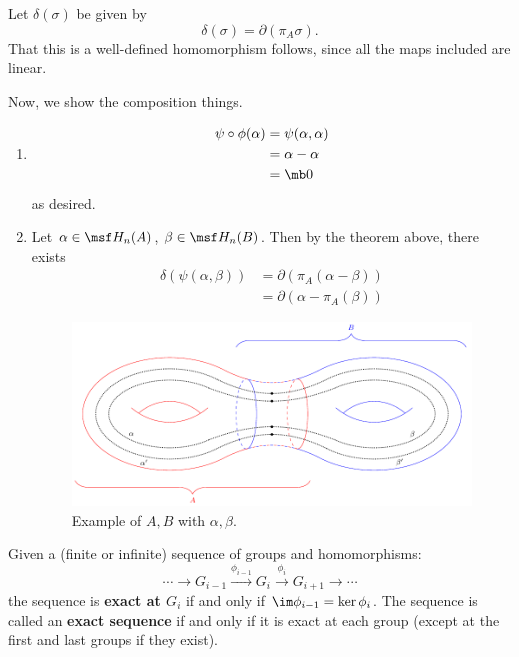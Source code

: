 \begin{solution}
\begin{enumerate}[label=(\arabic*)]
      Let $\delta(\sigma)$ be given by
      \[
        \delta(\sigma) = \partial(\pi_A \sigma).
      \]
      That this is a well-defined homomorphism follows, since all the
      maps included are linear.
  \end{enumerate}
  Now, we show the composition things.
  \begin{enumerate}
    \item
      \begin{align*}
        \psi \circ \phi(\alpha)
        &= \psi(\alpha, \alpha) \\
        &= \alpha - \alpha \\
        &= \mb 0
      \end{align*}
      as desired.
    \item Let $\alpha \in \msf H_n(A)$, $\beta \in \msf H_n(B)$. Then
      by the theorem above, there exists
      \begin{align*}
        \delta(\psi(\alpha, \beta))
        &= \partial (\pi_A (\alpha - \beta)) \\
        &= \partial(\alpha - \pi_A(\beta))
      \end{align*}
      \begin{figure}[H]
        \centering
        \includegraphics[width=\linewidth, keepaspectratio]{figures/two-torus-AB}
        \caption{Example of $A,B$ with $\alpha, \beta$.}
      \end{figure}
  \end{enumerate}
\end{solution}


\begin{definition}
  Given a (finite or infinite) sequence of groups and homomorphisms:
  \[
    \cdots \to G_{i-1}\stackrel{\phi_{i-1}}{\longrightarrow} G_{i}
    \stackrel{\phi_i}{\longrightarrow}G_{i+1} \to \cdots
  \]
  the sequence is \textbf{exact at $G_i$} if and only if $\im
  \phi_{i-1}=\ker \phi_{i}$. The sequence is called an \textbf{exact
    sequence} if and only if it is exact at each group (except at the
  first and last groups if they exist).
\end{definition}


